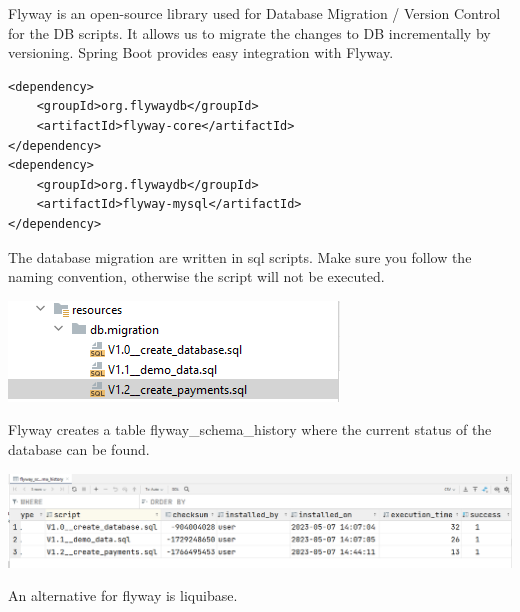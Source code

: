 Flyway is an open-source library used for Database Migration / Version Control for the DB scripts. It allows us to migrate the changes to DB incrementally by versioning.
Spring Boot provides easy integration with Flyway.


\begin{verbatim}
<dependency>
    <groupId>org.flywaydb</groupId>
    <artifactId>flyway-core</artifactId>
</dependency>
<dependency>
    <groupId>org.flywaydb</groupId>
    <artifactId>flyway-mysql</artifactId>
</dependency>
\end{verbatim}

The database migration are written in sql scripts. Make sure you follow the naming convention, otherwise the script will not be executed.

\includegraphics{./images/chapter-tx/flyway2.png}

Flyway creates a table flyway\_schema\_history where the current status of the database can be found.

\includegraphics[width=\textwidth]{./images/chapter-tx/flyway1.png}

An alternative for flyway is liquibase.





